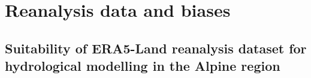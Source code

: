 
\chapter{Reanalysis data and biases}

\ifpdf
    \graphicspath{{Chapter2/Figs/Raster/}{Chapter2/Figs/PDF/}{Chapter2/Figs/}}
\else
    \graphicspath{{Chapter2/Figs/Vector/}{Chapter2/Figs/}}
\fi

\section{Suitability of ERA5-Land reanalysis dataset for hydrological modelling in the Alpine region\label{section2.1}}










